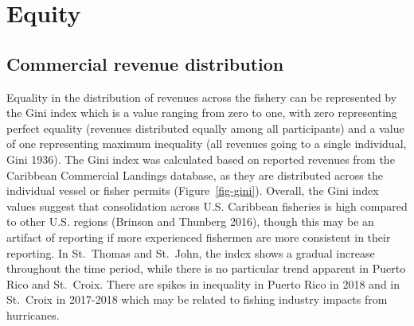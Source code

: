 \documentclass[
  letterpaper,
  oneside,
  open=any]{scrbook}
\begin{document}
\section{Equity}\label{equity}

\subsection{Commercial revenue
distribution}\label{commercial-revenue-distribution}

Equality in the distribution of revenues across the fishery can be
represented by the Gini index which is a value ranging from zero to one,
with zero representing perfect equality (revenues distributed equally
among all participants) and a value of one representing maximum
inequality (all revenues going to a single individual, Gini 1936). The
Gini index was calculated based on reported revenues from the Caribbean
Commercial Landings database, as they are distributed across the
individual vessel or fisher permits (Figure~\ref{fig-gini}). Overall,
the Gini index values suggest that consolidation across U.S. Caribbean
fisheries is high compared to other U.S. regions (Brinson and Thunberg
2016), though this may be an artifact of reporting if more experienced
fishermen are more consistent in their reporting. In St.~Thomas and
St.~John, the index shows a gradual increase throughout the time period,
while there is no particular trend apparent in Puerto Rico and
St.~Croix. There are spikes in inequality in Puerto Rico in 2018 and in
St.~Croix in 2017-2018 which may be related to fishing industry impacts
from hurricanes.
\end{document}
